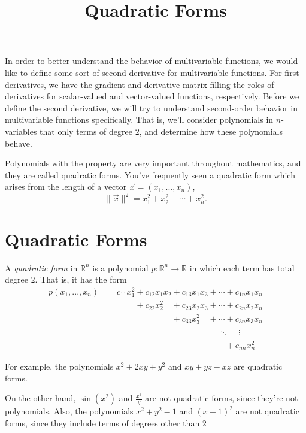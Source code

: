 \documentclass{ximera}
\title{Quadratic Forms}
\begin{document}
\begin{abstract}
\end{abstract}
\maketitle

In order to better understand the behavior of multivariable functions, we would like to define some sort of second derivative for multivariable functions. For first derivatives, we have the gradient and derivative matrix filling the roles of derivatives for scalar-valued and vector-valued functions, respectively. Before we define the second derivative, we will try to understand second-order behavior in multivariable functions specifically. That is, we'll consider polynomials in $n$-variables that only terms of degree $2$, and determine how these polynomials behave.

Polynomials with the property are very important throughout mathematics, and they are called quadratic forms. You've frequently seen a quadratic form which arises from the length of a vector $\vec{x} = (x_1,...,x_n)$,
\[
\|\vec{x}\|^2 = x_1^2 + x_2^2 + \cdots + x_n^2.
\]

\section*{Quadratic Forms}

\begin{definition}
A \emph{quadratic form} in $\mathbb{R}^n$ is a polynomial $p:\mathbb{R}^n\rightarrow\mathbb{R}$ in which each term has total degree $2$. That is, it has the form
\begin{align*}
p(x_1,...,x_n) &= c_{11}x_1^2+c_{12}x_1x_2+c_{13}x_1x_3 + \cdots + c_{1n}x_1x_n\\
&\phantom{= c_{11}x_1^2}+c_{22}x_2^2\phantom{x_2}+c_{23}x_2x_3 + \cdots + c_{2n}x_2x_n\\
&\phantom{= c_{11}x_1^2+c_{12}x_1x_2}+c_{33}x_3^2\phantom{x_3} + \cdots + c_{3n}x_3x_n\\
&\phantom{= c_{11}x_1^2+c_{12}x_1x_2+c_{13}x_1x_3 +} \ddots \phantom{+} \vdots\\
&\phantom{= c_{11}x_1^2+c_{12}x_1x_2+c_{13}x_1x_3 + \cdots }+ c_{nn}x_n^2
\end{align*}
\end{definition}

\begin{example}
For example, the polynomials $x^2+2xy+y^2$ and $xy+yz-xz$ are quadratic forms.

On the other hand, $\sin(x^2)$ and $\frac{x^3}{y}$ are not quadratic forms, since they're not polynomials. Also, the polynomials $x^2+y^2-1$ and $(x+1)^2$ are not quadratic forms, since they include terms of degrees other than $2$
\end{example}
\end{document}
